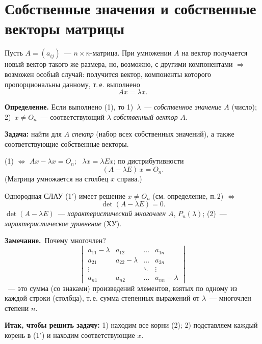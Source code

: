 \documentclass[a4paper,11pt]{article}
\newcommand{\zam}{\textbf{Замечание.}\ }
\begin{document}
\section{Собственные значения и собственные векторы матрицы}
Пусть $A=(a_{ij})$~--- $n\times n$-матрица. При умножении $A$ на вектор получается новый вектор
такого же размера, но, возможно, с другими компонентами $\Rightarrow$ возможен особый случай:
получится вектор, компоненты которого пропорциональны данному, т.\,е. выполнено
\[
Ax=\lambda x.\tag{1}
\]
\begin{opr}
\textbf{Определение.} Если выполнено (1), то 1)~$\lambda$~--- \emph{собственное значение} $A$ (число);
2)~$x\ne O_n$~--- соответствующий $\lambda$ \emph{собственный вектор} $A$.
\end{opr}

\textbf{Задача:} найти для $A$ \emph{спектр} (набор всех собственных значений), а также соответствующие
собственные векторы.

(1) $\iff$ $Ax-\lambda x=O_n$; \ $\lambda x=\lambda Ex$; по дистрибутивности
\[
(A-\lambda E)\,x=O_n.\tag{1$'$}
\]
(Матрица умножается на столбец $x$ справа.)

Однородная СЛАУ (1$'$) имеет решение $x\ne O_n$ (см. определение, п.\,2) $\iff$
\[
\det(A-\lambda E)=0.\tag{2}
\]
$\det(A-\lambda E)$~--- \emph{характеристический многочлен} $A$, $P_n(\lambda)$;
(2)~--- \emph{характеристическое уравнение} (ХУ).

\zam Почему многочлен?
\[
\begin{vmatrix}a_{11}-\lambda&a_{12}&\dots&a_{1n}\\a_{21}&a_{22}-\lambda&\dots&a_{2n}\\
\vdots&&\ddots&\vdots\\a_{n1}&a_{n2}&\dots&a_{nn}-\lambda\end{vmatrix}
\]
~--- это сумма (со знаками) произведений элементов, взятых по одному из каждой строки (столбца), т.\,е.
сумма степенных выражений от $\lambda$~--- многочлен степени $n$.

\textbf{Итак, чтобы решить задачу:} 1) находим все корни (2); 2) подставляем каждый корень в (1$'$)
и находим соответствующие $x$.
\end{document}
